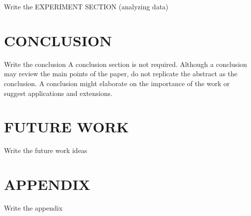 \documentclass[letterpaper, 10 pt, conference]{IEEEconf}
\newcommand{\todo}[1]{{\color{red}#1}}
\begin{document}
\todo{Write the EXPERIMENT SECTION (analyzing data)}


\section{CONCLUSION}

\todo{Write the conclusion}
A conclusion section is not required. Although a conclusion may review the main points of the paper, do not replicate the abstract as the conclusion. A conclusion might elaborate on the importance of the work or suggest applications and extensions.

\section{FUTURE WORK}

\todo{Write the future work ideas}

\addtolength{\textheight}{-12cm}


\section*{APPENDIX}

\todo{Write the appendix}

\byclass

\begin{center}
\end{center}
\end{document}
